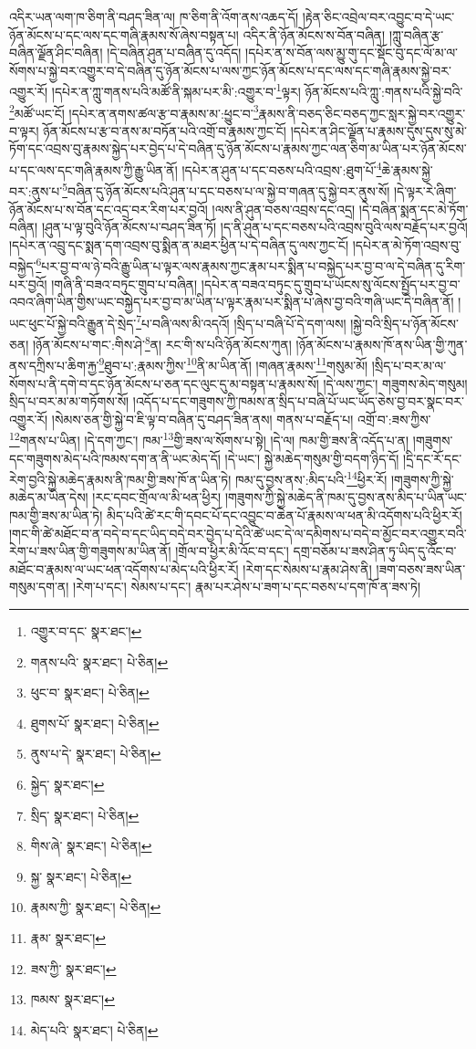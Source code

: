 འདིར་ཡན་ལག་ཁ་ཅིག་ནི་བཤད་ཟིན་ལ། ཁ་ཅིག་ནི་འོག་ནས་འཆད་དོ། །རྟེན་ཅིང་འབྲེལ་བར་འབྱུང་བ་དེ་ཡང་ཉོན་མོངས་པ་དང་ལས་དང་གཞི་རྣམས་སོ་ཞེས་བསྟན་པ། འདིར་ནི་ཉོན་མོངས་ས་བོན་བཞིན། །ཀླུ་བཞིན་རྩ་བཞིན་ལྗོན་ཤིང་བཞིན། །དེ་བཞིན་ཤུན་པ་བཞིན་དུ་འདོད། །དཔེར་ན་ས་བོན་ལས་མྱུ་གུ་དང་སྡོང་བུ་དང་ལོ་མ་ལ་སོགས་པ་སྐྱེ་བར་འགྱུར་བ་དེ་བཞིན་དུ་ཉོན་མོངས་པ་ལས་ཀྱང་ཉོན་མོངས་པ་དང་ལས་དང་གཞི་རྣམས་སྐྱེ་བར་འགྱུར་རོ། །དཔེར་ན་ཀླུ་གནས་པའི་མཚོ་ནི་སྐམ་པར་མི་:འགྱུར་བ་\footnote{འགྱུར་བ་དང་  སྣར་ཐང་། }ལྟར། ཉོན་མོངས་པའི་ཀླུ་:གནས་པའི་སྐྱེ་བའི་\footnote{གནས་པའི་  སྣར་ཐང་།  པེ་ཅིན། }མཚོ་ཡང་ངོ། །དཔེར་ན་ནགས་ཚལ་རྩ་བ་རྣམས་མ་:ཕྱུང་བ་\footnote{ཕུང་བ་  སྣར་ཐང་།  པེ་ཅིན། }རྣམས་ནི་བཅད་ཅིང་བཅད་ཀྱང་སླར་སྐྱེ་བར་འགྱུར་བ་ལྟར། ཉོན་མོངས་པ་རྩ་བ་ནས་མ་བཏོན་པའི་འགྲོ་བ་རྣམས་ཀྱང་ངོ། །དཔེར་ན་ཤིང་ལྗོན་པ་རྣམས་དུས་དུས་སུ་མེ་ཏོག་དང་འབྲས་བུ་རྣམས་སྐྱེད་པར་བྱེད་པ་དེ་བཞིན་དུ་ཉོན་མོངས་པ་རྣམས་ཀྱང་ལན་ཅིག་མ་ཡིན་པར་ཉོན་མོངས་པ་དང་ལས་དང་གཞི་རྣམས་ཀྱི་རྒྱུ་ཡིན་ནོ། །དཔེར་ན་ཤུན་པ་དང་བཅས་པའི་འབྲས་:ཐུག་པོ་\footnote{ཐུགས་པོ་  སྣར་ཐང་།  པེ་ཅིན། }ཆེ་རྣམས་སྐྱེ་བར་:ནུས་པ་\footnote{ནུས་པ་དེ་  སྣར་ཐང་།  པེ་ཅིན། }བཞིན་དུ་ཉོན་མོངས་པའི་ཤུན་པ་དང་བཅས་པ་ལ་སྐྱེ་བ་གཞན་དུ་སྐྱེ་བར་ནུས་སོ། །དེ་ལྟར་རེ་ཞིག་ཉོན་མོངས་པ་ས་བོན་དང་འདྲ་བར་རིག་པར་བྱའོ། །ལས་ནི་ཤུན་བཅས་འབྲས་དང་འདྲ། །དེ་བཞིན་སྨན་དང་མེ་ཏོག་བཞིན། །ཤུན་པ་ལྟ་བུའི་ཉོན་མོངས་པ་བཤད་ཟིན་ཏོ། །ད་ནི་ཤུན་པ་དང་བཅས་པའི་འབྲས་བུའི་ལས་བརྗོད་པར་བྱའོ། །དཔེར་ན་འབྲུ་དང་སྨན་དག་འབྲས་བུ་སྨིན་ན་མཐར་ཕྱིན་པ་དེ་བཞིན་དུ་ལས་ཀྱང་ངོ། །དཔེར་ན་མེ་ཏོག་འབྲས་བུ་བསྐྱེད་\footnote{སྐྱེད་  སྣར་ཐང་། }པར་བྱ་བ་ལ་ཉེ་བའི་རྒྱུ་ཡིན་པ་ལྟར་ལས་རྣམས་ཀྱང་རྣམ་པར་སྨིན་པ་བསྐྱེད་པར་བྱ་བ་ལ་དེ་བཞིན་དུ་རིག་པར་བྱའོ། །གཞི་ནི་བཟའ་བཏུང་གྲུབ་པ་བཞིན། །དཔེར་ན་བཟའ་བཏུང་དུ་གྲུབ་པ་ཡོངས་སུ་ལོངས་སྤྱོད་པར་བྱ་བ་འབའ་ཞིག་ཡིན་གྱིས་ཡང་བསྐྱེད་པར་བྱ་བ་མ་ཡིན་པ་ལྟར་རྣམ་པར་སྨིན་པ་ཞེས་བྱ་བའི་གཞི་ཡང་དེ་བཞིན་ནོ། །ཡང་ཕུང་པོ་སྐྱེ་བའི་རྒྱུན་དེ་སྲེད་\footnote{སྲིད་  སྣར་ཐང་།  པེ་ཅིན། }པ་བཞི་ལས་མི་འདའོ། །སྲིད་པ་བཞི་པོ་དེ་དག་ལས། །སྐྱེ་བའི་སྲིད་པ་ཉོན་མོངས་ཅན། །ཉོན་མོངས་པ་གང་:གིས་ཤེ་\footnote{གིས་ཞེ་  སྣར་ཐང་།  པེ་ཅིན། }ན། རང་གི་ས་པའི་ཉོན་མོངས་ཀུན། །ཉོན་མོངས་པ་རྣམས་ཁོ་ནས་ཡིན་གྱི་ཀུན་ནས་དཀྲིས་པ་ཆིག་རྐྱ་\footnote{སྐྱ་  སྣར་ཐང་།  པེ་ཅིན། }ཐུབ་པ་:རྣམས་ཀྱིས་\footnote{རྣམས་ཀྱི་  སྣར་ཐང་།  པེ་ཅིན། }ནི་མ་ཡིན་ནོ། །གཞན་རྣམས་\footnote{རྣམ་  སྣར་ཐང་། }གསུམ་མོ། །སྲིད་པ་བར་མ་ལ་སོགས་པ་ནི་དགེ་བ་དང་ཉོན་མོངས་པ་ཅན་དང་ལུང་དུ་མ་བསྟན་པ་རྣམས་སོ། །དེ་ལས་ཀྱང་། གཟུགས་མེད་གསུམ། སྲིད་པ་བར་མ་མ་གཏོགས་སོ། །འདོད་པ་དང་གཟུགས་ཀྱི་ཁམས་ན་སྲིད་པ་བཞི་པོ་ཡང་ཡོད་ཅེས་བྱ་བར་སྣང་བར་འགྱུར་རོ། །སེམས་ཅན་གྱི་སྐྱེ་བ་ཇི་ལྟ་བ་བཞིན་དུ་བཤད་ཟིན་ནས། གནས་པ་བརྗོད་པ། འགྲོ་བ་:ཟས་ཀྱིས་\footnote{ཟས་ཀྱི་  སྣར་ཐང་། }གནས་པ་ཡིན། །དེ་དག་ཀྱང་། ཁམ་\footnote{ཁམས་  སྣར་ཐང་། }གྱི་ཟས་ལ་སོགས་པ་སྟེ། །དེ་ལ། ཁམ་གྱི་ཟས་ནི་འདོད་པ་ན། །གཟུགས་དང་གཟུགས་མེད་པའི་ཁམས་དག་ན་ནི་ཡང་མེད་དོ། །དེ་ཡང་། སྐྱེ་མཆེད་གསུམ་གྱི་བདག་ཉིད་དོ། །དྲི་དང་རོ་དང་རེག་བྱའི་སྐྱེ་མཆེད་རྣམས་ནི་ཁམ་གྱི་ཟས་ཁོ་ན་ཡིན་ཏེ། ཁམ་དུ་བྱས་ནས་:མིད་པའི་\footnote{མེད་པའི་  སྣར་ཐང་།  པེ་ཅིན། }ཕྱིར་རོ། །གཟུགས་ཀྱི་སྐྱེ་མཆེད་མ་ཡིན་དེས། །རང་དབང་གྲོལ་ལ་མི་ཕན་ཕྱིར། །གཟུགས་ཀྱི་སྐྱེ་མཆེད་ནི་ཁམ་དུ་བྱས་ནས་མིད་པ་ཡིན་ཡང་ཁམ་གྱི་ཟས་མ་ཡིན་ཏེ། མིད་པའི་ཚེ་རང་གི་དབང་པོ་དང་འབྱུང་བ་ཆེན་པོ་རྣམས་ལ་ཕན་མི་འདོགས་པའི་ཕྱིར་རོ། །གང་གི་ཚེ་མཐོང་བ་ན་བདེ་བ་དང་ཡིད་བདེ་བར་བྱེད་པ་དེའི་ཚེ་ཡང་དེ་ལ་དམིགས་པ་བདེ་བ་མྱོང་བར་འགྱུར་བའི་རེག་པ་ཟས་ཡིན་གྱི་གཟུགས་མ་ཡིན་ནོ། །གྲོལ་བ་ཕྱིར་མི་འོང་བ་དང་། དགྲ་བཅོམ་པ་ཟས་ཤིན་ཏུ་ཡིད་དུ་འོང་བ་མཐོང་བ་རྣམས་ལ་ཡང་ཕན་འདོགས་པ་མེད་པའི་ཕྱིར་རོ། །རེག་དང་སེམས་པ་རྣམ་ཤེས་ནི། །ཟག་བཅས་ཟས་ཡིན་གསུམ་དག་ན། །རེག་པ་དང་། སེམས་པ་དང་། རྣམ་པར་ཤེས་པ་ཟག་པ་དང་བཅས་པ་དག་ཁོ་ན་ཟས་ཏེ། 